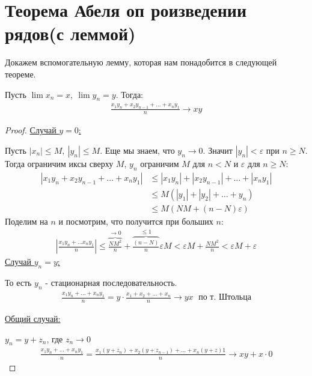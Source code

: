 \section{Теорема Абеля оп роизведении рядов(с леммой)}
Докажем вспомогательную лемму, которая нам понадобится в следующей теореме.
\begin{lemma}
    Пусть $\lim x_n = x,\ \lim y_n = y$. Тогда:
    \begin{gather*}
        \frac{x_1 y_n + x_2y_{n-1} + \ldots + x_ny_1}{n} \to xy
    \end{gather*}
\end{lemma}
\begin{proof} \quad 

    \underline{Случай $y = 0$:}

    Пусть $|x_n| \leq M,\ |y_n| \leq M$. Еще мы знаем, что $y_n \to 0$. Значит $|y_n| < \varepsilon$ при $n \geq N$.
    Тогда ограничим иксы сверху $M$, $y_n$ ограничим $M$ для $n < N$ и $\varepsilon$ для $n \geqslant N$:
    \begin{align*}
        |x_1y_n + x_2y_{n-1} + \ldots + x_ny_1| &\leqslant |x_1y_n| + |x_2y_{n-1}| + \ldots + |x_ny_1| \\
        &\leqslant M(|y_1|+|y_2|+\ldots + y_n) \\
        &\leqslant M(NM + (n-N)\varepsilon)
    \end{align*}
    Поделим на $n$ и посмотрим, что получится при больших $n$:
    \begin{gather*}
        \left|\frac{x_1y_n+\ldots x_ny_1}{n}\right|
        \leqslant \overbrace{\frac{NM^2}{n}}^{\to 0} +  \overbrace{\frac{(n-N)}{n}}^{\leq 1}\varepsilon M 
        < \varepsilon M + \frac{NM^2}{n}
        < \varepsilon M + \varepsilon
    \end{gather*}
    \underline{Случай $y_n = y$:} 
    
    То есть $y_n$ - стационарная последовательность.
    \begin{gather*}
        \frac{x_1y_n + \ldots + x_ny_1}{n} = y \cdot \frac{x_1+x_2+\ldots+x_n}{n} \longrightarrow yx \; \text{ по т. Штольца}
    \end{gather*}

    \underline{Общий случай:} 
    
    $y_n = y+z_n$, где $z_n \longrightarrow 0$
    \begin{gather*}
        \frac{x_1y_n + \ldots + x_ny_1}{n} = \frac{x_1(y+z_n) + x_2(y+z_{n-1}) + \ldots + x_n(y+z)1}{n} \longrightarrow xy + x\cdot 0 
    \end{gather*}
\end{proof}
